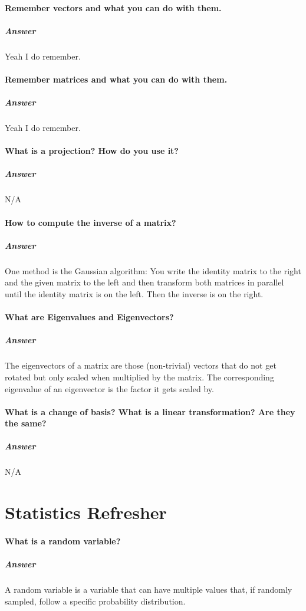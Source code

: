\documentclass[a4paper, 11pt, accentcolor = tud3b]{tudreport}
\newcommand{\answer}[1]{\subparagraph{Answer} #1}
\begin{document}
			\paragraph{Remember vectors and what you can do with them.}
			\answer{Yeah I do remember.}

			\paragraph{Remember matrices and what you can do with them.}
			\answer{Yeah I do remember.}

			\paragraph{What is a projection? How do you use it?}
			\answer{N/A} %

			\paragraph{How to compute the inverse of a matrix?}
			\answer{One method is the Gaussian algorithm: You write the identity matrix to the right and the given matrix to the left and then transform both matrices in parallel until the identity matrix is on the left. Then the inverse is on the right.}

			\paragraph{What are Eigenvalues and Eigenvectors?}
			\answer{The eigenvectors of a matrix are those (non-trivial) vectors that do not get rotated but only scaled when multiplied by the matrix. The corresponding eigenvalue of an eigenvector is the factor it gets scaled by.}

			\paragraph{What is a change of basis? What is a linear transformation? Are they the same?}
			\answer{N/A} %

		\section{Statistics Refresher}
			\paragraph{What is a random variable?}
			\answer{A random variable is a variable that can have multiple values that, if randomly sampled, follow a specific probability distribution.}
			
\end{document}
